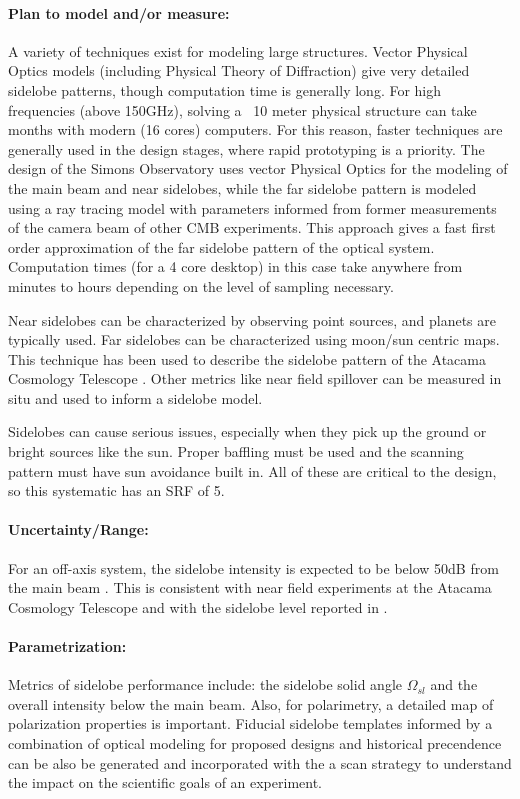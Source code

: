 \paragraph{Plan to model and/or measure:}

A variety of techniques exist for modeling large structures. Vector Physical Optics models (including Physical Theory of Diffraction) give very detailed sidelobe patterns, though computation time is generally long. For high frequencies (above 150GHz), solving a ~10 meter physical structure can take months with modern (16 cores) computers. For this reason, faster techniques are generally used in the design stages, where rapid prototyping is a priority. The design of the Simons Observatory uses vector Physical Optics for the modeling of the main beam and near sidelobes, while the far sidelobe pattern is modeled using a ray tracing model with parameters informed from former measurements of the camera beam of other CMB experiments. This approach gives a fast first order approximation of the far sidelobe pattern of the optical system. Computation times (for a 4 core desktop) in this case take anywhere from minutes to hours depending on the level of sampling necessary.

Near sidelobes can be characterized by observing point sources, and planets are typically used. Far sidelobes can be characterized using moon/sun centric maps. This technique has been used to describe the sidelobe pattern of the Atacama Cosmology Telescope \cite{gallardo_2018}. Other metrics like near field spillover can be measured in situ and used to inform a sidelobe model.

Sidelobes can cause serious issues, especially when they pick up the ground or bright sources like the sun. Proper baffling must be used and the scanning pattern must have sun avoidance built in. All of these are critical to the design, so this systematic has an SRF of 5.
\paragraph{Uncertainty/Range:}
For an off-axis system, the sidelobe intensity is expected to be below 50dB from the main beam \cite{lockman_stray_2002}. This is consistent with near field experiments at the Atacama Cosmology Telescope \cite{dunner_far_2012} and with the sidelobe level reported in \cite{naess_atacama_2014}.


\paragraph{Parametrization:} Metrics of sidelobe performance include: the sidelobe solid angle $\Omega_{sl}$ and the overall intensity below the main beam. Also, for polarimetry, a detailed map of polarization properties is important. Fiducial sidelobe templates informed by a combination of optical modeling for proposed designs and historical precendence can be also be generated and incorporated with the a scan strategy to understand the impact on the scientific goals of an experiment.

